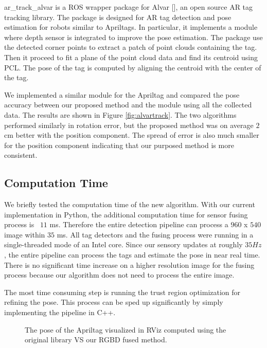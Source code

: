 ar\_track\_alvar is a ROS wrapper package for Alvar [], an open source AR tag tracking library. The package is designed for AR tag detection and pose estimation for robots similar to Apriltags. In particular, it implements a module where depth sensor is integrated to improve the pose estimation. The package use the detected corner points to extract a patch of point clouds containing the tag. Then it proceed to fit a plane of the point cloud data and find its centroid using PCL. The pose of the tag is computed by aligning the centroid with the center of the tag.   

We implemented a similar module for the Apriltag and compared the pose accuracy between our proposed method and the module using all the collected data. The results are shown in Figure \ref{fig:alvartrack}. The two algorithms performed similarly in rotation error, but the proposed method was on average $2$ cm better with the position component. The spread of error is also much smaller for the position component indicating that our purposed method is more consistent.

\subsection{Computation Time}
We briefly tested the computation time of the new algorithm. With our current implementation in Python, the additional computation time for sensor fusing process is ~$11$ ms. Therefore the entire detection pipeline can process a $960$ x $540$ image within $35$ ms. All tag detectors and the fusing process were running in a single-threaded mode of an Intel core. Since our sensory updates at roughly $35Hz$, the entire pipeline can process the tags and estimate the pose in near real time. There is no significant time increase on a higher resolution image for the fusing process because our algorithm does not need to process the entire image.

The most time consuming step is running the trust region optimization for refining the pose. This process can be sped up significantly by simply implementing the pipeline in C++.

\begin{figure}
\label{fig:result_compare}
\caption{The pose of the Apriltag visualized in RViz computed using the original library VS our RGBD fused method.}
\end{figure}
